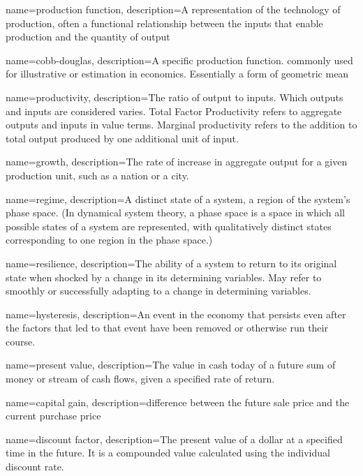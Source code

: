 {
name=production function,
description={A representation of the technology of production, often a functional relationship between the inputs that enable production and the quantity of output}
}

{
name=cobb-douglas,
description={A specific production function. commonly used for illustrative or estimation in economics. Essentially a form of geometric mean}
}

{
name=productivity,
description={The ratio of output to inputs. Which outputs and inputs are considered varies. Total Factor Productivity refers to aggregate outputs and inputs in value terms. Marginal productivity refers to the addition to total output produced by one additional unit of input.} 
}

{
name=growth,
description={The rate of increase in aggregate output for a given production unit, such as a nation  or a city.}
}

{
name=regime,
description={A distinct state of a system, a region of the system's phase space. (In dynamical system theory, a phase space is a space in which all possible states of a system are represented, with qualitatively distinct  states corresponding to one region in the phase space.)}
}

{
name=resilience,
description={The ability of a system to return to its original state when shocked by a change in its determining variables. May refer to smoothly or successfully adapting to a change in  determining variables. }
}

{
name=hysteresis,
description={An event in the economy that persists even after the factors that led to that event have been removed or otherwise run their course.}
}

{
name=present value,
description={The value in cash today of a future sum of money or stream of cash flows, given a specified rate of return.}
}

{
name=capital gain,
description={difference between the future sale price and the current purchase price}
}

{
name=discount factor,
description={The present value of a dollar at a specified time in the future. It is a compounded value calculated using the individual discount rate.}
}

